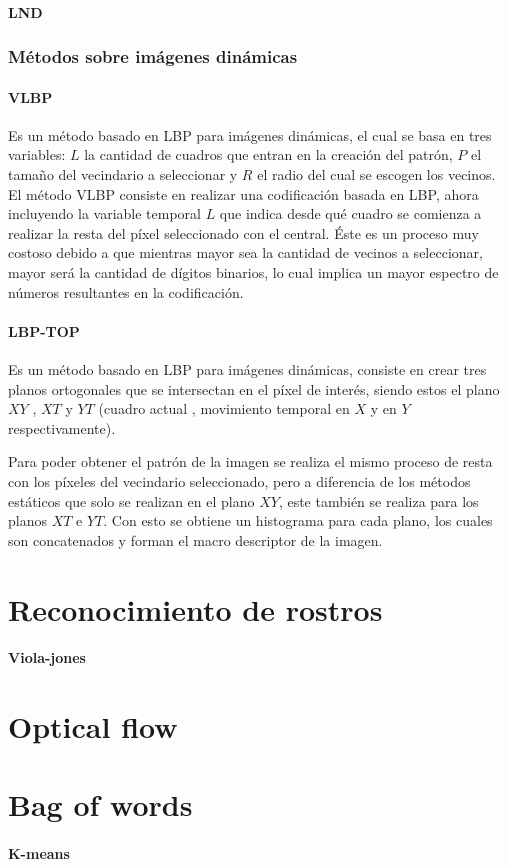 		\paragraph{LND}
		\label{sec:lnd}

	\subsubsection{Métodos sobre imágenes dinámicas}	
	\label{sec:met_videos}

		\paragraph{VLBP}
		\label{sec:vlbp}
		Es un método basado en LBP para imágenes dinámicas, el cual se basa en tres variables: $L$ la cantidad de cuadros que entran en la creación del patrón, $P$ el tamaño del vecindario a seleccionar y $R$ el radio del cual se escogen los vecinos. 
El método VLBP consiste en realizar una codificación basada en LBP, ahora incluyendo la variable temporal $L$ que indica desde qué cuadro se comienza a realizar la resta del píxel seleccionado con el central.
Éste es un proceso muy costoso debido a que mientras mayor sea la cantidad de vecinos a seleccionar, mayor será la cantidad de dígitos binarios, lo cual implica un mayor espectro de números resultantes en la codificación.

		\paragraph{LBP-TOP}
		\label{sec:lbp-top}
		 Es un método basado en LBP para imágenes dinámicas, consiste en crear tres planos ortogonales que se intersectan en el píxel de interés, siendo estos el plano $XY$ , $XT$ y $YT$ (cuadro actual , movimiento temporal en $X$ y en $Y$ respectivamente). 

Para poder obtener el patrón de la imagen se realiza el mismo proceso de resta con los píxeles del vecindario seleccionado, pero a diferencia de los métodos estáticos que solo se realizan en el plano $XY$, este también se realiza para los planos $XT$ e $YT$. Con esto se obtiene un histograma para cada plano, los cuales son concatenados y forman el macro descriptor de la imagen.


\section{Reconocimiento de rostros}
\label{sec:rec_rostros}

	\paragraph{Viola-jones}
	\label{sec:viola-jones}

\section{Optical flow}
\label{sec:optical_flow}

\section{Bag of words}
\label{sec:bag_of_words}

	\paragraph{K-means}
	\label{sec:k-means}